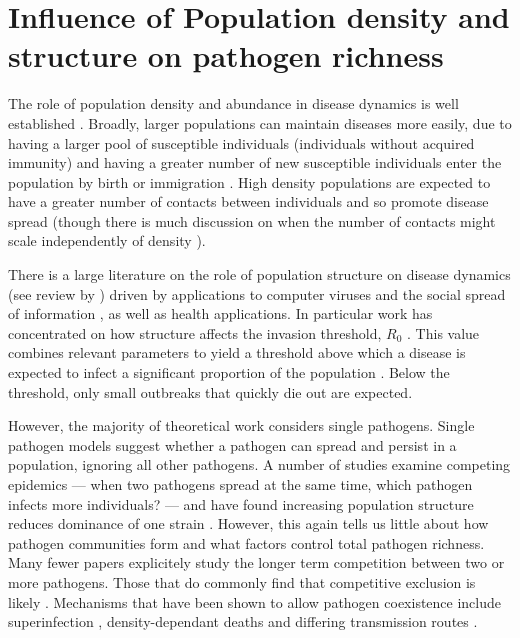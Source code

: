 \section{Influence of Population density and structure on pathogen richness}




The role of population density and abundance in disease dynamics is well established \cite{may1979population, anderson1979population, heesterbeek2002brief, lloyd2005should}.
Broadly, larger populations can maintain diseases more easily, due to having a larger pool of susceptible individuals (individuals without acquired immunity) and having a greater number of new susceptible individuals enter the population by birth or immigration \cite{may1979population, anderson1979population}.
High density populations are expected to have a greater number of contacts between individuals and so promote disease spread (though there is much discussion on when the number of contacts might scale independently of density \cite{mccallum2001should}).


There is a large literature on the role of population structure on disease dynamics (see review by \textcite{pastor2015epidemic}) driven by applications to computer viruses \cite{pastor2001epidemic} and the social spread of information \cite{goffman1964generalization}, as well as health applications.
In particular work has concentrated on how structure affects the invasion threshold, $R_0$ \cite{colizza2007invasion, barthelemy2010fluctuation, wu2013threshold, may2001infection, pastor2001epidemic}. 
This value combines relevant parameters to yield a threshold above which a disease is expected to infect a significant proportion of the population \cite{may1979population, anderson1979population}.
Below the threshold, only small outbreaks that quickly die out are expected.

However, the majority of theoretical work considers single pathogens.
Single pathogen models suggest whether a pathogen can spread and persist in a population, ignoring all other pathogens.
A number of studies examine competing epidemics --- when two pathogens spread at the same time, which pathogen infects more individuals? --- and have found increasing population structure reduces dominance of one strain \cite{van2014domination, poletto2013host, poletto2015characterising}.
However, this again tells us little about how pathogen communities form and what factors control total pathogen richness.
Many fewer papers explicitely study the longer term competition between two or more pathogens.
Those that do commonly find that competitive exclusion is likely \cite{castillo1995dynamics, bremermann1989competitive, martcheva2013competitive, ackleh2003competitive, ackleh2014robust, turner2002impact}.
Mechanisms that have been shown to allow pathogen coexistence include superinfection \cite{may1994superinfection, li2010age}, density-dependant deaths \cite{ackleh2003competitive, kirupaharan2004coexistence} and differing transmission routes \cite{allen2003dynamics}.

